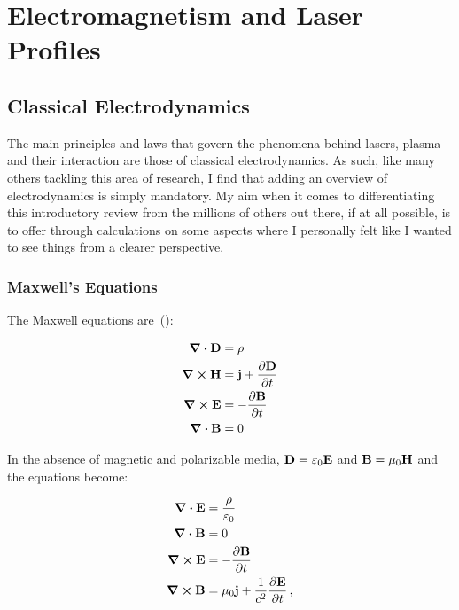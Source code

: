 \documentclass[12pt, class=report, crop=false]{standalone}
\begin{document}
\chapter{Electromagnetism and Laser Profiles}%
\label{chap:electromagnetism}

\section{Classical Electrodynamics}

The main principles and laws that govern the phenomena behind lasers, plasma and their interaction are those of classical electrodynamics. As such, like many others tackling this area of research, I find that adding an overview of electrodynamics is simply mandatory. My aim when it comes to differentiating this introductory review from the millions of others out there, if at all possible, is to offer through calculations on some aspects where I personally felt like I wanted to see things from a clearer perspective.

\subsection{Maxwell's Equations}

The Maxwell equations are~(\cite{jacksonClassicalElectrodynamics1999}):

\begin{subequations}
  \begin{align}
    \div{\vb{D}} & = \rho \\
    \curl{\vb{H}} & = \vb{j} + \pdv{\vb{D}}{t} \\
    \curl{\vb{E}} & = - \pdv{\vb{B}}{t} \\
    \div{\vb{B}} & = 0
  \end{align}
\end{subequations}

In the absence of magnetic and polarizable media, \(\vb{D}=\varepsilon_0 \vb{E}\) and \(\vb{B}=\mu_0 \vb{H}\) and the equations become:

\begin{subequations}%
  \label{eq:maxwell}
  \begin{align}
    \div{\vb{E}} & = \frac{\rho}{\varepsilon_0} \label{eq:coulomb-law} \\
    \div{\vb{B}} & = 0 \label{eq:gauss-law} \\
    \curl{\vb{E}} & = - \pdv{\vb{B}}{t} \label{eq:faraday-law} \\
    \curl{\vb{B}} & = \mu_0 \vb{j} + \frac{1}{c^2} \pdv{\vb{E}}{t} \,, \label{eq:ampere-law}
  \end{align}
\end{subequations}
\end{document}
